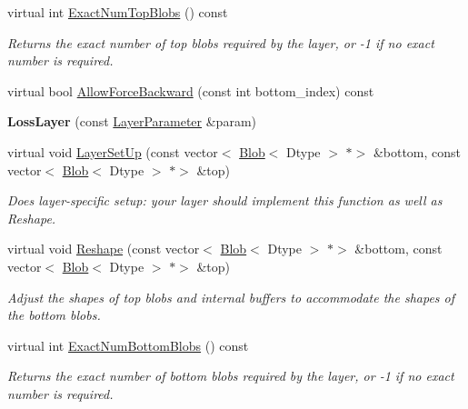 \begin{DoxyCompactItemize}
virtual int \mbox{\hyperlink{classcaffe_1_1_loss_layer_aa5d5ab714a14082f5343dc9c49025b23}{Exact\+Num\+Top\+Blobs}} () const
\begin{DoxyCompactList}\small\item\em Returns the exact number of top blobs required by the layer, or -\/1 if no exact number is required. \end{DoxyCompactList}\item 
virtual bool \mbox{\hyperlink{classcaffe_1_1_loss_layer_a36d35155bfe0de53a79c517f33759612}{Allow\+Force\+Backward}} (const int bottom\+\_\+index) const
\item 
\mbox{\label{classcaffe_1_1_loss_layer_a16e133050e2d97c6f024ea74e3ba4ead}} 
{\bfseries Loss\+Layer} (const \mbox{\hyperlink{classcaffe_1_1_layer_parameter}{Layer\+Parameter}} \&param)
\item 
virtual void \mbox{\hyperlink{classcaffe_1_1_loss_layer_a479314172e8fbe1485f59537c1fba222}{Layer\+Set\+Up}} (const vector$<$ \mbox{\hyperlink{classcaffe_1_1_blob}{Blob}}$<$ Dtype $>$ $\ast$$>$ \&bottom, const vector$<$ \mbox{\hyperlink{classcaffe_1_1_blob}{Blob}}$<$ Dtype $>$ $\ast$$>$ \&top)
\begin{DoxyCompactList}\small\item\em Does layer-\/specific setup\+: your layer should implement this function as well as Reshape. \end{DoxyCompactList}\item 
virtual void \mbox{\hyperlink{classcaffe_1_1_loss_layer_a1324e1bd42d84a6eb7e2c559d2da9ecc}{Reshape}} (const vector$<$ \mbox{\hyperlink{classcaffe_1_1_blob}{Blob}}$<$ Dtype $>$ $\ast$$>$ \&bottom, const vector$<$ \mbox{\hyperlink{classcaffe_1_1_blob}{Blob}}$<$ Dtype $>$ $\ast$$>$ \&top)
\begin{DoxyCompactList}\small\item\em Adjust the shapes of top blobs and internal buffers to accommodate the shapes of the bottom blobs. \end{DoxyCompactList}\item 
virtual int \mbox{\hyperlink{classcaffe_1_1_loss_layer_af1620064baefb711e2c767bdc92b6fb1}{Exact\+Num\+Bottom\+Blobs}} () const
\begin{DoxyCompactList}\small\item\em Returns the exact number of bottom blobs required by the layer, or -\/1 if no exact number is required. \end{DoxyCompactList}\item 

\end{DoxyCompactItemize}

